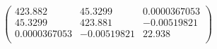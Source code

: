 \documentclass{article}
\begin{document}
\[\left(
\begin{array}{ccc}
 423.882 & 45.3299 & 0.0000367053 \\
 45.3299 & 423.881 & -0.00519821 \\
 0.0000367053 & -0.00519821 & 22.938 \\
\end{array}
\right)\]
\end{document}
